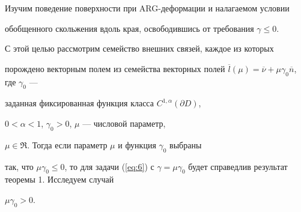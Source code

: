 Изучим поведение поверхности при ARG-деформации и налагаемом условии 


обобщенного скольжения вдоль края, освободившись от требования $\gamma \le 0$.


С этой целью рассмотрим семейство внешних связей, каждое из которых 


порождено векторным полем из семейства векторных полей $\overline l (\mu)


= \overline \nu+\mu \gamma_0 \overline n $, где $\gamma_0$ --- 


заданная фиксированная функция класса $C^{1,\alpha } ({\partial D})$,


$0 < \alpha < 1$, $\gamma_0 > 0$, $\mu$ --- числовой параметр,


$\mu \in \Re$. Тогда если параметр $\mu$ и функция $\gamma_0$ выбраны 


так, что $\mu \gamma_0 \le 0$, то для задачи (\ref{eq:6}) с $\gamma=\mu


\gamma_0$ будет справедлив результат теоремы 1. Исследуем случай 


$\mu \gamma_0 > 0$.





